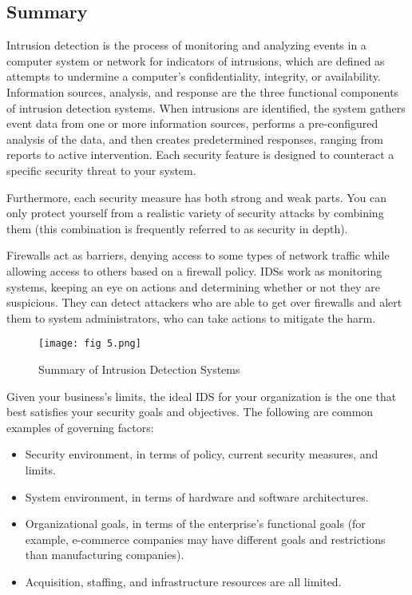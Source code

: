 \documentclass[12pt]{article}
\begin{document}
    \subsection{Summary}
    \par Intrusion detection is the process of monitoring and analyzing events in a computer system or network for indicators of intrusions, which are defined as attempts to undermine a computer's confidentiality, integrity, or availability. Information sources, analysis, and response are the three functional components of intrusion detection systems. When intrusions are identified, the system gathers event data from one or more information sources, performs a pre-configured analysis of the data, and then creates predetermined responses, ranging from reports to active intervention. Each security feature is designed to counteract a specific security threat to your system.
    \par Furthermore, each security measure has both strong and weak parts. You can only protect yourself from a realistic variety of security attacks by combining them (this combination is frequently referred to as security in depth).
    \par Firewalls act as barriers, denying access to some types of network traffic while allowing access to others based on a firewall policy. IDSs work as monitoring systems, keeping an eye on actions and determining whether or not they are suspicious. They can detect attackers who are able to get over firewalls and alert them to system administrators, who can take actions to mitigate the harm. 
    
    \begin{figure}[h]
        \centering
        \texttt{[image: fig 5.png]}
        \caption{Summary of Intrusion Detection Systems}
    \end{figure}
    
    \par Given your business's limits, the ideal IDS for your organization is the one that best satisfies your security goals and objectives. The following are common examples of governing factors:
    \begin{itemize}
        \item Security environment, in terms of policy, current security measures, and limits.
        \item System environment, in terms of hardware and software architectures.
        \item Organizational goals, in terms of the enterprise's functional goals (for example, e-commerce companies may have different goals and restrictions than manufacturing companies).
        \item Acquisition, staffing, and infrastructure resources are all limited.
    \end{itemize}
    
\end{document}
